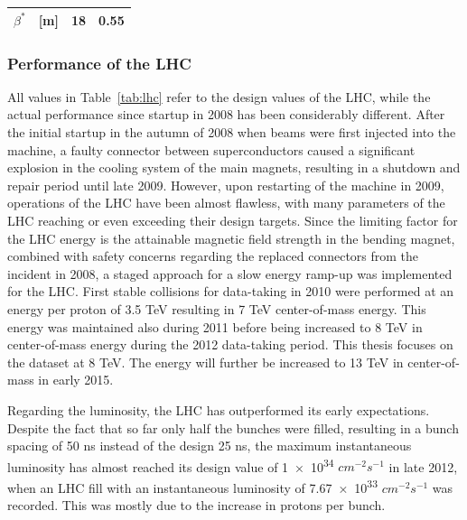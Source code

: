 \begin{table}
\begin{center}
\begin{tabular}{ r l | c | c }
    $\beta^*$                                                   & [m]          & 18                                           & 0.55 \\        \hline %
    \hline
    \end{tabular}
    \end{center}
\end{table}

\subsubsection*{Performance of the LHC}
All values in Table~\ref{tab:lhc} refer to the design values of the LHC, while the actual performance since startup in
2008 has been considerably different. After the initial startup in the autumn of 2008 when beams were first injected 
into the machine, a faulty connector between superconductors caused a significant explosion in the cooling system of the main magnets, resulting
in a shutdown and repair period until late 2009. However, upon restarting of the machine in 2009, operations of
the LHC have been almost flawless, with many parameters of the LHC reaching or even exceeding their design targets.
Since the limiting factor for the LHC energy is the attainable magnetic field strength in the bending magnet, combined with 
safety concerns regarding the replaced connectors from the incident in 2008, a staged approach for a slow energy ramp-up
was implemented for the LHC. First stable collisions for data-taking in 2010 were performed at an energy per proton
of 3.5 TeV resulting in 7 TeV center-of-mass energy. This energy was maintained also during 2011 before being increased
to 8 TeV in center-of-mass energy during the 2012 data-taking period. This thesis focuses on the dataset at 8 TeV.
The energy will further be increased to 13 TeV in center-of-mass in early 2015.

Regarding the luminosity, the LHC has outperformed its early expectations. Despite the fact that so far only
half the bunches were filled, resulting in a bunch spacing of 50 ns instead of the design 25 ns, the maximum
instantaneous luminosity has almost reached its design value of \num{1e34} $cm^{-2}s^{-1}$ in late 2012, when 
an LHC fill with an instantaneous luminosity of \num{7.67e33} $cm^{-2}s^{-1}$ was recorded. This was mostly
due to the increase in protons per bunch.

